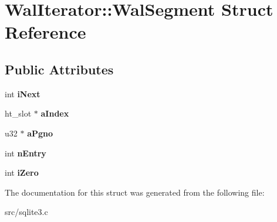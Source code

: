 \hypertarget{struct_wal_iterator_1_1_wal_segment}{\section{Wal\-Iterator\-:\-:Wal\-Segment Struct Reference}
\label{struct_wal_iterator_1_1_wal_segment}
}
\subsection*{Public Attributes}
\begin{DoxyCompactItemize}
\item 
\hypertarget{struct_wal_iterator_1_1_wal_segment_a329c939b196f907fe98cf762bb07d291}{int {\bfseries i\-Next}}\label{struct_wal_iterator_1_1_wal_segment_a329c939b196f907fe98cf762bb07d291}

\item 
\hypertarget{struct_wal_iterator_1_1_wal_segment_adec397836a127acafcc551cb1fdcd851}{ht\-\_\-slot $\ast$ {\bfseries a\-Index}}\label{struct_wal_iterator_1_1_wal_segment_adec397836a127acafcc551cb1fdcd851}

\item 
\hypertarget{struct_wal_iterator_1_1_wal_segment_a5e43273a11dc5856934834c0cdf7f198}{u32 $\ast$ {\bfseries a\-Pgno}}\label{struct_wal_iterator_1_1_wal_segment_a5e43273a11dc5856934834c0cdf7f198}

\item 
\hypertarget{struct_wal_iterator_1_1_wal_segment_ad80cf479aa670eda7aa1adee607af7d9}{int {\bfseries n\-Entry}}\label{struct_wal_iterator_1_1_wal_segment_ad80cf479aa670eda7aa1adee607af7d9}

\item 
\hypertarget{struct_wal_iterator_1_1_wal_segment_a3eedec5e8e8dd94be670d50ac144a959}{int {\bfseries i\-Zero}}\label{struct_wal_iterator_1_1_wal_segment_a3eedec5e8e8dd94be670d50ac144a959}

\end{DoxyCompactItemize}


The documentation for this struct was generated from the following file\-:\begin{DoxyCompactItemize}
\item 
src/sqlite3.\-c\end{DoxyCompactItemize}
